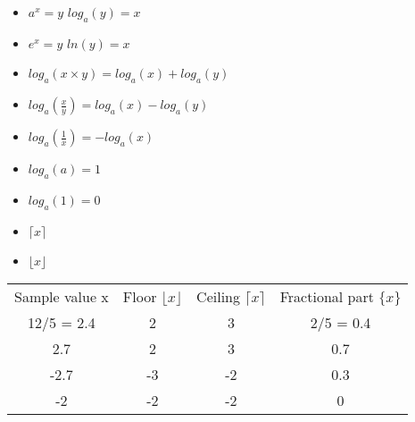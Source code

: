 \documentclass[12pt]{article}
\begin{document}

\begin{itemize}
\item $a^x = y$  $log_a(y) = x$

\item $e^x = y$  $ln(y)=x$

\item $log_a(x\times y) = log_a(x) + log_a(y)$

\item $log_a(\frac{x}{y}) = log_a(x) - log_a(y)$

\item $log_a(\frac{1}{x}) = - log_a(x)$

\item $log_a(a) = 1$

\item $log_a(1) = 0$
\end{itemize}


\begin{itemize}
\item $\lceil x\rceil$

\item $\lfloor x\rfloor$
\end{itemize}

\begin{tabular}{|c|c|c|c|}
\hline Sample value x & Floor $\lfloor x\rfloor$ & Ceiling  $\lceil x\rceil$ & Fractional part $ \{ x \} $\\
12/5 = 2.4 &	2	&3&	2/5 = 0.4\\
2.7&	2&	3	&0.7\\
-2.7&	-3&	-2	&0.3\\
-2&	-2&	-2	&0\\
\hline 
\end{tabular} 
\end{document}
